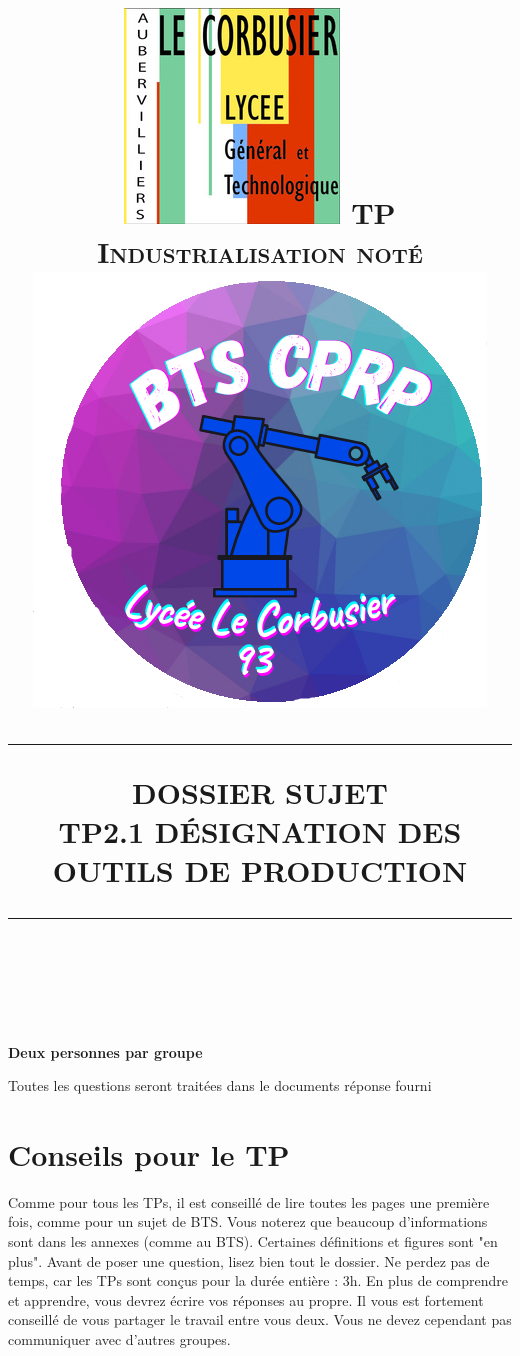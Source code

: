 \documentclass[12pt]{article}
\newcommand{\HRule}[1]{\rule{\linewidth}{#1}}
\begin{document}
 
\title{ \includegraphics[width=0.18\linewidth]{Images/corbu.jpg} \hspace{2cm} \normalsize \textsc{TP Industrialisation noté \hspace{2cm} \includegraphics[width=0.2\linewidth]{Images/logo.png}}
		\\ [2.0cm]
		\HRule{0.5pt} DOSSIER SUJET \\
		\LARGE \textbf{\uppercase{TP2.1 Désignation des outils de production}}
		\HRule{2pt} \\ [0.5cm]}
\maketitle

\textbf{Deux personnes par groupe}\\
\begin{center}
Toutes les questions seront traitées dans le documents réponse fourni
\end{center}










\sectionfont{\scshape}




\newpage




\tableofcontents
\newpage



\section{Conseils pour le TP}
  \bcinfo Comme pour tous les TPs, il est conseillé de lire toutes les pages une première fois, comme pour un sujet de BTS. Vous noterez que beaucoup d'informations sont dans les annexes (comme au BTS). Certaines définitions et figures sont "en plus". Avant de poser une question, lisez bien tout le dossier. Ne perdez pas de temps, car les TPs sont conçus pour la durée entière : 3h. En plus de comprendre et apprendre, vous devrez écrire vos réponses au propre. Il vous est fortement conseillé de vous partager le travail entre vous deux. Vous ne devez cependant pas communiquer avec d'autres groupes.
\end{document}
